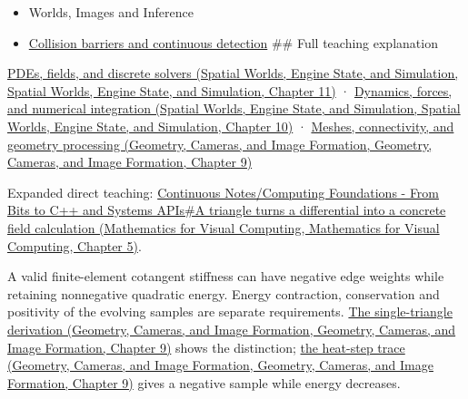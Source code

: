 \begin{itemize}
\item
  {Worlds, Images and Inference}
\item
  \hyperref[appendix-a9ba01fa72a6]{Collision barriers and continuous detection} \#\# Full teaching explanation
\end{itemize}

\href{../05-Spatial-Worlds-Engine-State-and-Simulation/main.pdf\#nameddest=04-visual-computing-ii-ch030-pdes-fields-and-discrete-solvers}{PDEs, fields, and discrete solvers (Spatial Worlds, Engine State, and Simulation, Spatial Worlds, Engine State, and Simulation, Chapter 11)} · \href{../05-Spatial-Worlds-Engine-State-and-Simulation/main.pdf\#nameddest=04-visual-computing-ii-ch029-dynamics-forces-and-numerical-integration}{Dynamics, forces, and numerical integration (Spatial Worlds, Engine State, and Simulation, Spatial Worlds, Engine State, and Simulation, Chapter 10)} · \href{../03-Geometry-Cameras-and-Image-Formation/main.pdf\#nameddest=03-visual-computing-i-ch002-meshes-connectivity-and-geometry-processing}{Meshes, connectivity, and geometry processing (Geometry, Cameras, and Image Formation, Geometry, Cameras, and Image Formation, Chapter 9)}

Expanded direct teaching: \href{../02-Mathematics-for-Visual-Computing/main.pdf\#nameddest=02-foundations-ii-ch021-a-triangle-turns-a-differential-into-a-concrete-field-calculation}{Continuous Notes/Computing Foundations - From Bits to C++ and Systems APIs\#A triangle turns a differential into a concrete field calculation (Mathematics for Visual Computing, Mathematics for Visual Computing, Chapter 5)}.

A valid finite-element cotangent stiffness can have negative edge weights while retaining nonnegative quadratic energy. Energy contraction, conservation and positivity of the evolving samples are separate requirements. \href{../03-Geometry-Cameras-and-Image-Formation/main.pdf\#nameddest=03-visual-computing-i-ch002-nonnegative-energy-and-nonnegative-weights-are-different-promises}{The single-triangle derivation (Geometry, Cameras, and Image Formation, Geometry, Cameras, and Image Formation, Chapter 9)} shows the distinction; \href{../03-Geometry-Cameras-and-Image-Formation/main.pdf\#nameddest=03-visual-computing-i-ch002-a-stable-heat-step-can-still-create-a-negative-sample}{the heat-step trace (Geometry, Cameras, and Image Formation, Geometry, Cameras, and Image Formation, Chapter 9)} gives a negative sample while energy decreases.
